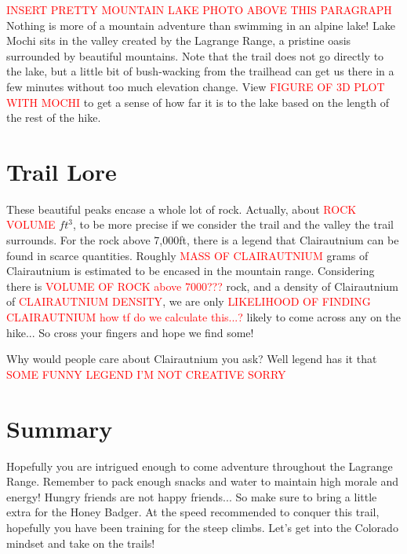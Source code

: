 \documentclass[12pt]{article}   %
\theoremstyle{definition}
\numberwithin{equation}{section}
\begin{document}
\quad \textcolor{red}{INSERT PRETTY MOUNTAIN LAKE PHOTO ABOVE THIS PARAGRAPH} Nothing is more of a mountain adventure than swimming in an alpine lake! Lake Mochi sits in the valley created by the Lagrange Range, a pristine oasis surrounded by beautiful mountains. Note that the trail does not go directly to the lake, but a little bit of bush-wacking from the trailhead can get us there in a few minutes without too much elevation change. View \textcolor{red}{FIGURE OF 3D PLOT WITH MOCHI} to get a sense of how far it is to the lake based on the length of the rest of the hike.
\section{Trail Lore} \label{APPM2350proj02sec05}

\quad These beautiful peaks encase a whole lot of rock. Actually, about \textcolor{red}{ROCK VOLUME} $ft^3$, to be more precise if we consider the trail and the valley the trail surrounds. For the rock above 7,000ft, there is a legend that Clairautnium can be found in scarce quantities. Roughly \textcolor{red}{MASS OF CLAIRAUTNIUM} grams of Clairautnium is estimated to be encased in the mountain range. Considering there is \textcolor{red}{VOLUME OF ROCK above 7000???} rock, and a density of Clairautnium of \textcolor{red}{CLAIRAUTNIUM DENSITY}, we are only \textcolor{red}{LIKELIHOOD OF FINDING CLAIRAUTNIUM how tf do we calculate this...?} likely to come across any on the hike... So cross your fingers and hope we find some!

\quad Why would people care about Clairautnium you ask? Well legend has it that \textcolor{red}{SOME FUNNY LEGEND I'M NOT CREATIVE SORRY}
\section{Summary} \label{APPM2350proj02sec06}

\quad Hopefully you are intrigued enough to come adventure throughout the Lagrange Range. Remember to pack enough snacks and water to maintain high morale and energy! Hungry friends are not happy friends... So make sure to bring a little extra for the Honey Badger. At the speed recommended to conquer this trail, hopefully you have been training for the steep climbs. Let's get into the Colorado mindset and take on the trails!
\end{document}
